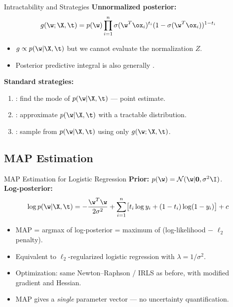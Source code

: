 \begin{frame}{Intractability and Strategies}
  \textbf{Unnormalized posterior:}
  \[
    g(\w;\X,\t) = p(\w)\prod_{i=1}^n \sigma(\w^T\ox_i)^{t_i}(1-\sigma(\w^T\ox_i))^{1-t_i}
  \]
  \begin{itemize}
    \item $g \propto p(\w|\X,\t)$ but we cannot evaluate the normalization $Z$.
    \item Posterior predictive integral is also generally .
  \end{itemize}
  \vspace{0.2cm}
  \textbf{Standard strategies:}
  \begin{enumerate}
    \item {}: find the mode of $p(\w|\X,\t)$ — point estimate.
    \item {}: approximate $p(\w|\X,\t)$ with a tractable distribution.
    \item {}: sample from $p(\w|\X,\t)$ using only $g(\w;\X,\t)$.
  \end{enumerate}
\end{frame}

\subsection{MAP Estimation}

\begin{frame}{MAP Estimation for Logistic Regression}
  \textbf{Prior:} $p(\w) = \mathcal{N}(\w|\mathbf{0},\sigma^2\I)$.\\[0.3em]
  \textbf{Log-posterior:}
  \[
    \log p(\w|\X,\t) = -\frac{\w^T\w}{2\sigma^2} + \sum_{i=1}^n\bigl[t_i\log y_i + (1-t_i)\log(1-y_i)\bigr] + c
  \]
  \begin{itemize}
    \item MAP = argmax of log-posterior = maximum of (log-likelihood $-$ $\ell_2$ penalty).
    \item Equivalent to $\ell_2$-regularized logistic regression with $\lambda = 1/\sigma^2$.
    \item Optimization: same Newton--Raphson / IRLS as before, with modified gradient and Hessian.
    \item MAP gives a \emph{single} parameter vector — no uncertainty quantification.
  \end{itemize}
\end{frame}

